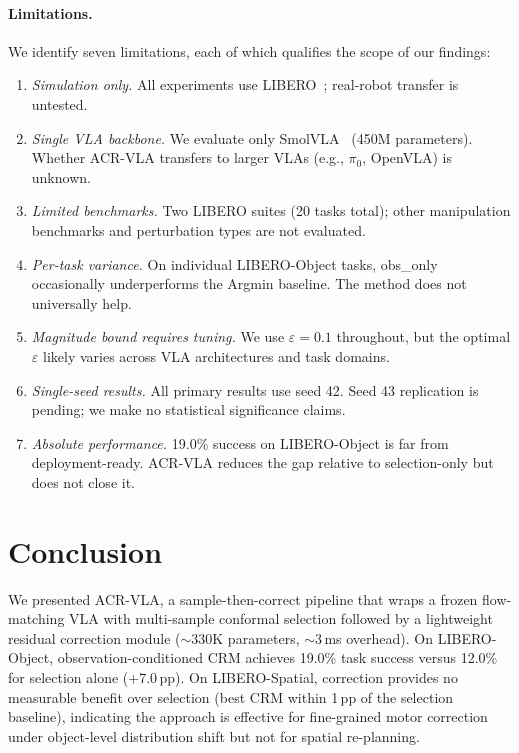 \paragraph{Limitations.}
We identify seven limitations, each of which qualifies the scope of our findings:
\begin{enumerate}[nosep]
  \item \emph{Simulation only.} All experiments use LIBERO~\cite{liu2023libero}; real-robot transfer is untested.
  \item \emph{Single VLA backbone.} We evaluate only SmolVLA~\cite{shukor2025smolvla} (450M parameters). Whether ACR-VLA transfers to larger VLAs (e.g., $\pi_0$, OpenVLA) is unknown.
  \item \emph{Limited benchmarks.} Two LIBERO suites (20 tasks total); other manipulation benchmarks and perturbation types are not evaluated.
  \item \emph{Per-task variance.} On individual LIBERO-Object tasks, obs\_only occasionally underperforms the Argmin baseline. The method does not universally help.
  \item \emph{Magnitude bound requires tuning.} We use $\varepsilon{=}0.1$ throughout, but the optimal $\varepsilon$ likely varies across VLA architectures and task domains.
  \item \emph{Single-seed results.} All primary results use seed 42. Seed 43 replication is pending; we make no statistical significance claims.
  \item \emph{Absolute performance.} 19.0\% success on LIBERO-Object is far from deployment-ready. ACR-VLA reduces the gap relative to selection-only but does not close it.
\end{enumerate}


\section{Conclusion}
\label{sec:conclusion}

We presented ACR-VLA, a sample-then-correct pipeline that wraps a frozen flow-matching VLA with multi-sample conformal selection followed by a lightweight residual correction module (${\sim}$330K parameters, ${\sim}$3\,ms overhead).
On LIBERO-Object, observation-conditioned CRM achieves 19.0\% task success versus 12.0\% for selection alone (+7.0\,pp).
On LIBERO-Spatial, correction provides no measurable benefit over selection (best CRM within 1\,pp of the selection baseline), indicating the approach is effective for fine-grained motor correction under object-level distribution shift but not for spatial re-planning.

